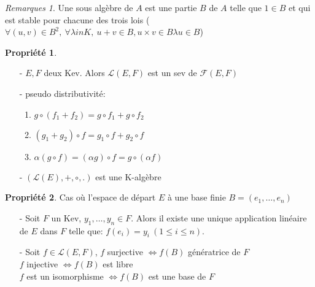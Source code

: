\documentclass[fleqn]{article}
\theoremstyle{definition} \newtheorem*{defi}{D\'efinition}
\theoremstyle{definition} \newtheorem*{theo}{Th\'eor\`eme}
\theoremstyle{definition} \newtheorem*{coro}{Corollaire}
\theoremstyle{definition} \newtheorem*{nota}{Notation}
\theoremstyle{remark} \newtheorem*{rqs}{Remarques}
\theoremstyle{definition} \newtheorem*{prop}{Propri\'et\'e}
\begin{document}
\begin{rqs}
Une sous alg\`ebre de $A$ est une partie $B$ de $A$ telle que $1 \in B$ et qui est stable pour chacune des trois lois ($\forall (u,v) \in B^2,\ \forall \lambda in K,\ u+v \in B, u \times v \in B \lambda u \in B$)
\end{rqs}

\begin{prop} $ $
	\begin{itemize}
		\item [-] $E,F$ deux Kev. Alors $\mathscr{L}(E,F)$ est un sev de $\mathscr{F}(E,F)$
		\item [-] pseudo distributivit\'e:
			\begin{enumerate}
				\item $g \circ (f_1 + f_2) = g \circ f_1 + g \circ f_2$
				\item $(g_1 + g_2) \circ f = g_1 \circ f + g_2 \circ f$
				\item $\alpha (g \circ f) = (\alpha g) \circ f = g \circ (\alpha f)$
			\end{enumerate}
		\item [-] $(\mathscr{L}(E), +, \circ, .)$ est une K-alg\`ebre
	\end{itemize}
\end{prop}

\pagebreak
\begin{prop} Cas o\`u l'espace de d\'epart $E$ \`a une base finie $B=(e_1, \hdots, e_n)$
	\begin{itemize}
		\item [-] Soit $F$ un Kev, $y_1, \hdots, y_n \in F$. Alors il existe
			une unique application lin\'eaire de $E$ dans $F$ telle que: $f(e_i) = y_i\ (1 \leq i \leq n)$.
		\item [-] Soit $f \in \mathscr{L}(E,F)$,
			$f$ surjective $\Leftrightarrow f(B)$ g\'en\'eratrice de $F$\\
			$f$ injective $\Leftrightarrow f(B)$ est libre\\
			$f$ est un isomorphisme $\Leftrightarrow f(B)$ est une base de $F$
	\end{itemize}
\end{prop}

\end{document}
